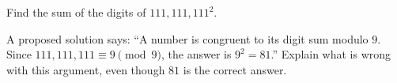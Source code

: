Find the sum of the digits of $111{,}111{,}111^2$.

A proposed solution says: ``A number is congruent to its digit sum modulo $9$. Since $111{,}111{,}111\equiv9\pmod9$, the answer is $9^2=81$.'' Explain what is wrong with this argument, even though $81$ is the correct answer.

